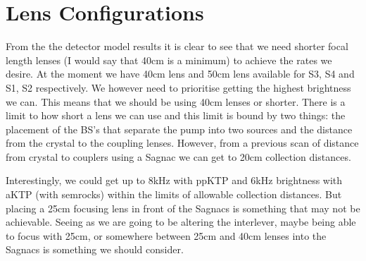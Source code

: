 \documentclass[aps,floatfix,superscriptaddress,onecolumn,tightenlines,amsmath,amssymb,nofootinbib,raggedbottom,nobalancelastpage,10pt]{revtex4-2}
\begin{document}
%    
%    

\section*{Lens Configurations} 

From the the detector model results it is clear to see that we need shorter focal length lenses (I would say that 40cm is a minimum) to achieve the rates we desire. At the moment we have 40cm lens and 50cm lens available for S3, S4 and S1, S2 respectively. We however need to prioritise getting the highest brightness we can. This means that we should be using 40cm lenses or shorter. There is a limit to how short a lens we can use and this limit is bound by two things: the placement of the BS's that separate the pump into two sources and the distance from the crystal to the coupling lenses. However, from a previous scan of distance from crystal to couplers using a Sagnac we can get to 20cm collection distances.

\vspace{1em}  

Interestingly, we could get up to 8kHz with ppKTP and 6kHz brightness with aKTP (with semrocks) within the limits of allowable collection distances. But placing a 25cm focusing lens in front of the Sagnacs is something that may not be achievable. Seeing as we are going to be altering the interlever, maybe being able to focus with 25cm, or somewhere between 25cm and 40cm lenses into the Sagnacs is something we should consider. 
\end{document}

